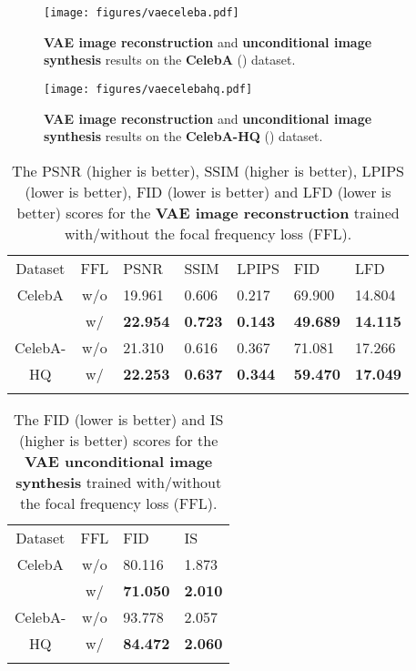 \documentclass[10pt,twocolumn,letterpaper]{article}
\begin{document}
\begin{figure}[t]
	\centering
	\vspace{-0.2cm}
	\texttt{[image: figures/vaeceleba.pdf]}
\caption{\textbf{VAE image reconstruction} and \textbf{unconditional image synthesis} results on the \textbf{CelebA} () dataset.}
	\label{fig:vaeceleba}
	\vspace{-0.35cm}
\end{figure}





\begin{figure}[t]
	\centering
\texttt{[image: figures/vaecelebahq.pdf]}
	\vspace{-0.05cm}
	\caption{\textbf{VAE image reconstruction} and \textbf{unconditional image synthesis} results on the \textbf{CelebA-HQ} () dataset.}
	\label{fig:vaecelebahq}
	\vspace{-0.12cm}
\end{figure}


\begin{table}[tb!]
\centering
\footnotesize
\caption{The PSNR (higher is better), SSIM (higher is better), LPIPS (lower is better), FID (lower is better) and LFD (lower is better) scores for the \textbf{VAE image reconstruction} trained with/without the focal frequency loss (FFL).}
\begin{tabularx}{\linewidth}{c|c|*{5}{|Y}}
\Xhline{1pt}
Dataset& FFL & PSNR& SSIM& LPIPS& FID& LFD \\
\Xhline{0.6pt}
CelebA& w/o & 19.961& 0.606& 0.217& 69.900& 14.804 \\
& w/ &  {\bf22.954}& {\bf0.723}& {\bf0.143}& {\bf49.689}& {\bf14.115} \\
\Xhline{0.6pt}
CelebA-& w/o & 21.310& 0.616& 0.367& 71.081& 17.266 \\
HQ& w/ &  {\bf22.253}& {\bf0.637}& {\bf0.344}& {\bf59.470}& {\bf17.049} \\
\Xhline{1pt}
\end{tabularx}
\label{tbl:vaerec}
\vspace{-0.15cm}
\end{table}





\begin{table}[tb!]
\centering
\footnotesize
\caption{The FID (lower is better) and IS (higher is better) scores for the \textbf{VAE unconditional image synthesis} trained with/without the focal frequency loss (FFL).}
\begin{tabularx}{\linewidth}{c|c|*{2}{|Y}}
\Xhline{1pt}
Dataset& FFL & FID& IS \\
\Xhline{0.6pt}
CelebA& w/o & 80.116& 1.873 \\
& w/ &  {\bf71.050}& {\bf2.010} \\
\Xhline{0.6pt}
CelebA-& w/o & 93.778& 2.057 \\
HQ& w/ &  {\bf84.472}& {\bf2.060} \\
\Xhline{1pt}
\end{tabularx}
\label{tbl:vaegen}
\vspace{-0.6cm}
\end{table}
\end{document}

